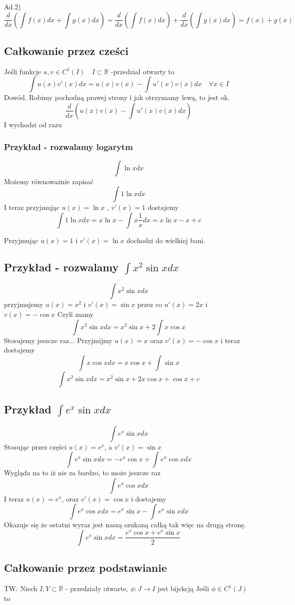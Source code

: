 Ad.2) $$\frac{d}{dx}(\int f(x)dx + \int g(x)dx) = \frac{d}{dx}(\int f(x)dx) + \frac{d}{dx}(\int g(x)dx) = f(x) + g(x)$$

\subsection{Całkowanie przez cześci}
Jeśli funkcje $u,v \in C^1(I)\quad I \subset \mathbb{R}$ -przedział otwarty 
to
$$\int u(x)v'(x)dx = u(x)v(x) - \int u'(x)v(x)dx \quad \forall x \in I $$
Dowód.
Robimy pochodną prawej strony i jak otrzymamy lewą, to jest ok.
$$\frac{d}{dx}\left(u(x)v(x) - \int u'(x)v(x)dx\right)$$
I wychodzi od razu 

\subsubsection{Przykład - rozwalamy logarytm}
$$\int \ln{x} dx $$
Możemy równoważnie zapisać
$$\int 1 \ln{x} dx $$
I teraz przyjmując $u(x) = \ln{x}$ , $v'(x) = 1$ dostajemy
$$\int 1 \ln{x} dx = x\ln{x} - \int x \frac{1}{x} dx = x\ln{x} - x + c$$

Przyjmując $u(x) = 1$ i $v'(x) = \ln{x}$ dochodzi do wielkiej bani.
\subsection{Przykład - rozwalamy $\int x^2\sin{x}dx$}
$$\int x^2 \sin{x} dx$$
przyjmujemy $u(x)=x^2$ i $v'(x) = \sin{x}$ przez co $u'(x) = 2x$ i $v(x) = -\cos{x}$
Czyli mamy
$$\int x^2 \sin{x} dx = x^2\sin{x} + 2\int x\cos{x}$$
Stosujemy jeszcze raz... Przyjmijmy $u(x) = x$ oraz $v'(x) = -\cos{x}$ i teraz dostajemy 
$$\int x \cos{x}dx = x\cos{x} + \int \sin{x}$$
$$\int x^2 \sin{x} dx = x^2\sin{x} + 2x\cos{x} + \cos{x} + c$$

\subsection{Przykład $\int e^x\sin{x}dx$}
$$\int e^x\sin{x}dx$$
Stosując przez części $u(x) = e^x$, a $v'(x) = \sin{x}$
$$\int e^x\sin{x}dx = -e^{x}\cos{x} + \int e^x \cos{x} dx$$
Wygląda na to iż nie za bardzo, to może jeszcze raz
$$\int e^x \cos{x} dx$$
I teraz $u(x) = e^x$, oraz $v'(x) = \cos{x}$ i dostajemy
$$\int e^x \cos{x} dx = e^x\sin{x} - \int e^x\sin{x} dx$$
Okazuje się że ostatni wyraz jest naszą szukaną całką tak więc na drugą stronę.
$$\int e^x\sin{x} dx = \frac{e^x\cos{x} + e^x\sin{x}}{2}$$

\subsection{Całkowanie przez podstawianie}
TW:
Niech $I,Y  \subset \mathbb{R}$ - przedziały otwarte, $ \phi : J \to I$ jest bijekcją  
Jeśli $\phi \in C^1(J)$ to

